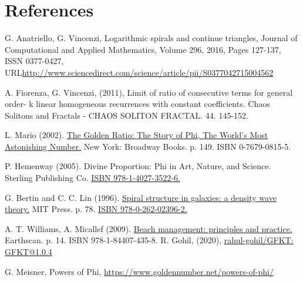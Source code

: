 \documentclass[preprint,12pt]{elsarticle}
\begin{document}
\section*{References}
\begin{thebibliography}{9}
	G. Anatriello, G. Vincenzi,
	Logarithmic spirals and continue triangles,
	Journal of Computational and Applied Mathematics,
	Volume 296,
	2016,
	Pages 127-137,
	ISSN 0377-0427,
	URL\url{http://www.sciencedirect.com/science/article/pii/S0377042715004562}
	
	A. Fiorenza, G. Vincenzi, (2011), Limit of ratio of consecutive terms for general order- k linear homogeneous recurrences with constant coefficients. Chaos Solitons and Fractals - CHAOS SOLITON FRACTAL. 44. 145-152. 
	
	L. Mario (2002). \href{https://archive.org/details/goldenratiostory00livi/page/149}{The Golden Ratio: The Story of Phi, The World's Most Astonishing Number.} New York: Broadway Books. p. 149. ISBN 0-7679-0815-5.
	
	P. Hemenway (2005). Divine Proportion: Phi in Art, Nature, and Science. Sterling Publishing Co. \href{https://en.wikipedia.org/wiki/Special:BookSources/978-1-4027-3522-6}{ISBN 978-1-4027-3522-6.}
	
	G. Bertin and C. C. Lin (1996). \href{https://books.google.com/books?id=06yfwrdpTk4C&pg=PA78}{Spiral structure in galaxies: a density wave theory.} MIT Press. p. 78. \href{https://en.wikipedia.org/wiki/Special:BookSources/978-0-262-02396-2}{ISBN 978-0-262-02396-2.}
	
	 A. T. Williams, A. Micallef (2009). \href{https://books.google.com/books?id=z_vKEMeJXKYC&pg=PA14}{Beach management: principles and practice.} Earthscan. p. 14. ISBN 978-1-84407-435-8.
	R. Gohil, (2020), \href{https://github.com/rahul-gohil/GFKT}{rahul-gohil/GFKT: GFKT@1.0.4} 
	
	G. Meisner, Powers of Phi, \href{https://www.goldennumber.net/powers-of-phi/}{https://www.goldennumber.net/powers-of-phi/}
\end{thebibliography}
\end{document}
